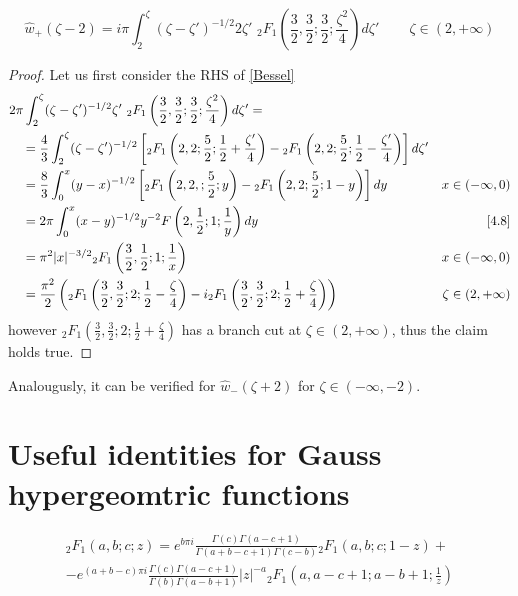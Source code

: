 \documentclass[11pt,a4paper,twoside,leqno,noamsfonts]{amsart}
\numberwithin{equation}{section}
\begin{document}
\begin{example}[Bessel]
\begin{claim}
\label{Bessel}
\begin{equation}
\hat{w}_{+}(\zeta-2)=i\pi\int_{2}^\zeta(\zeta-\zeta')^{-1/2}2\zeta'\,\,{}_2F_1\left(\frac{3}{2},\frac{3}{2};\frac{3}{2};\frac{\zeta^2}{4}\right)d\zeta'\,\qquad \zeta\in(2,+\infty)
\end{equation}
\end{claim}
\begin{proof}
Let us first consider the RHS of \eqref{Bessel}
\begin{align*}
&2\pi\int_{2}^\zeta(\zeta-\zeta')^{-1/2}\zeta'\,\,{}_2F_1\left(\frac{3}{2},\frac{3}{2};\frac{3}{2};\frac{\zeta^2}{4}\right)d\zeta'= &\\
&\quad = \frac{4}{3}\int_{2}^\zeta(\zeta-\zeta')^{-1/2}\left[{}_2F_1\left(2,2;\frac{5}{2};\frac{1}{2}+\frac{\zeta'}{4}\right)-{}_2F_1\left(2,2;\frac{5}{2};\frac{1}{2}-\frac{\zeta'}{4}\right)\right]d\zeta' &\\
&\quad =\frac{8}{3}\int_0^x(y-x)^{-1/2}\left[{}_2F_1\left(2,2,;\frac{5}{2};y\right)-{}_2F_1\left(2,2;\frac{5}{2};1-y\right)\right]dy & x\in (-\infty,0)\\
&\quad =2\pi\int_0^x(x-y)^{-1/2}y^{-2}F\left(2,\frac{1}{2};1;\frac{1}{y}\right)dy & \eqref{4.8} \\
&\quad =\pi^2|x|^{-3/2}{}_2F_1\left(\frac{3}{2},\frac{1}{2};1;\frac{1}{x}\right) & x\in (-\infty, 0)\\
&\quad =\frac{\pi^2}{2}\left({}_2F_1\left(\frac{3}{2},\frac{3}{2};2;\frac{1}{2}-\frac{\zeta}{4}\right)-i{}_2F_1\left(\frac{3}{2},\frac{3}{2};2;\frac{1}{2}+\frac{\zeta}{4}\right)\right) & \zeta\in(2,+\infty)
\end{align*}
however ${}_2F_1\left(\frac{3}{2},\frac{3}{2};2;\frac{1}{2}+\frac{\zeta}{4}\right)$ has a branch cut at $\zeta\in(2,+\infty)$, thus the claim holds true. 
\end{proof}
Analougusly, it can be verified for $\hat{w}_-(\zeta+2)$ for $\zeta\in(-\infty,-2)$.  
\end{example}


\section{Useful identities for Gauss hypergeomtric functions}

\begin{multline}
\label{w1w3w5}
{}_2F_1\left(a,b;c;z\right)=e^{b\pi i}\frac{\Gamma(c)\Gamma(a-c+1)}{\Gamma(a+b-c+1)\Gamma(c-b)}{}_2F_1\left(a,b;c;1-z\right)+\\
-e^{(a+b-c)\pi i}\frac{\Gamma(c)\Gamma(a-c+1)}{\Gamma(b)\Gamma(a-b+1)}|z|^{-a}{}_2F_1\left(a,a-c+1;a-b+1;\frac{1}{z}\right)
\end{multline}
\end{document}

